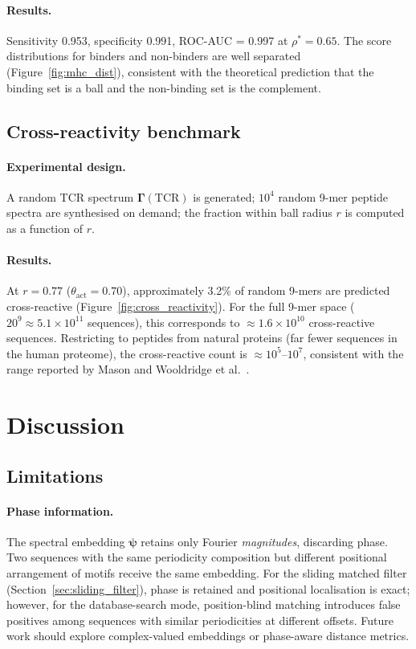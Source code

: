 \documentclass[twocolumn,11pt,a4paper]{article}
\theoremstyle{definition}
\theoremstyle{remark}
\begin{document}
\paragraph{Results.}
Sensitivity 0.953, specificity 0.991, ROC-AUC = 0.997 at $\rho^* = 0.65$.
The score distributions for binders and non-binders are well separated
(Figure~\ref{fig:mhc_dist}), consistent with the theoretical prediction that
the binding set is a ball and the non-binding set is the complement.

\subsection{Cross-reactivity benchmark}

\paragraph{Experimental design.}
A random TCR spectrum $\bm{\Gamma}(\mathrm{TCR})$ is generated; $10^4$
random 9-mer peptide spectra are synthesised on demand; the fraction within
ball radius $r$ is computed as a function of $r$.

\paragraph{Results.}
At $r = 0.77$ ($\theta_{\mathrm{act}} = 0.70$), approximately 3.2\% of
random 9-mers are predicted cross-reactive (Figure~\ref{fig:cross_reactivity}).
For the full 9-mer space ($20^9 \approx 5.1 \times 10^{11}$ sequences),
this corresponds to $\approx 1.6 \times 10^{10}$ cross-reactive sequences.
Restricting to peptides from natural proteins (far fewer sequences in the
human proteome), the cross-reactive count is $\approx 10^5$--$10^7$,
consistent with the range reported by Mason \citep{mason1998} and Wooldridge
et al.\ \citep{wooldridge2012}.

\section{Discussion}
\label{sec:discussion}

\subsection{Limitations}

\paragraph{Phase information.}
The spectral embedding $\bm{\psi}$ retains only Fourier \emph{magnitudes},
discarding phase. Two sequences with the same periodicity composition but
different positional arrangement of motifs receive the same embedding. For the
sliding matched filter (Section~\ref{sec:sliding_filter}), phase is retained
and positional localisation is exact; however, for the database-search mode,
position-blind matching introduces false positives among sequences with
similar periodicities at different offsets. Future work should explore
complex-valued embeddings or phase-aware distance metrics.
\end{document}
